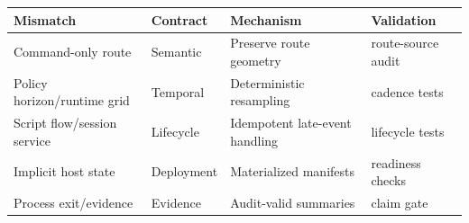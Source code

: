 \begin{tabular}{llll}
\toprule
Mismatch & Contract & Mechanism & Validation \\
\midrule
Command-only route & Semantic & Preserve route geometry & route-source audit \\
Policy horizon/runtime grid & Temporal & Deterministic resampling & cadence tests \\
Script flow/session service & Lifecycle & Idempotent late-event handling & lifecycle tests \\
Implicit host state & Deployment & Materialized manifests & readiness checks \\
Process exit/evidence & Evidence & Audit-valid summaries & claim gate \\
\bottomrule
\end{tabular}
